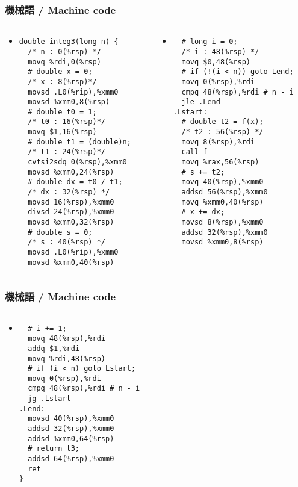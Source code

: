 \documentclass[12pt,dvipdfmx]{beamer}
\begin{document}
\begin{frame}[fragile]
  \frametitle{機械語 / Machine code}
  \begin{columns}
    \begin{column}{0.49\textwidth}
  \begin{itemize}
  \item []
\begin{lstlisting}
double integ3(long n) {
  /* n : 0(%rsp) */
  movq %rdi,0(%rsp)  
  # double x = 0;
  /* x : 8(%rsp)*/
  movsd .L0(%rip),%xmm0
  movsd %xmm0,8(%rsp)
  # double t0 = 1;
  /* t0 : 16(%rsp)*/
  movq $1,16(%rsp)
  # double t1 = (double)n;
  /* t1 : 24(%rsp)*/
  cvtsi2sdq 0(%rsp),%xmm0
  movsd %xmm0,24(%rsp)
  # double dx = t0 / t1;
  /* dx : 32(%rsp) */
  movsd 16(%rsp),%xmm0
  divsd 24(%rsp),%xmm0
  movsd %xmm0,32(%rsp)
  # double s = 0;
  /* s : 40(%rsp) */
  movsd .L0(%rip),%xmm0
  movsd %xmm0,40(%rsp)
\end{lstlisting}%
  \end{itemize}
    \end{column}
    \begin{column}{0.49\textwidth}
  \begin{itemize}
  \item []
\begin{lstlisting}
  # long i = 0;
  /* i : 48(%rsp) */
  movq $0,48(%rsp)
  # if (!(i < n)) goto Lend;
  movq 0(%rsp),%rdi
  cmpq 48(%rsp),%rdi # n - i
  jle .Lend
.Lstart:
  # double t2 = f(x);
  /* t2 : 56(%rsp) */
  movq 8(%rsp),%rdi
  call f
  movq %rax,56(%rsp)
  # s += t2;
  movq 40(%rsp),%xmm0
  addsd 56(%rsp),%xmm0
  movq %xmm0,40(%rsp)
  # x += dx;
  movsd 8(%rsp),%xmm0
  addsd 32(%rsp),%xmm0
  movsd %xmm0,8(%rsp)
\end{lstlisting}%
\end{itemize}
\end{column}
\end{columns}
  
\end{frame}


\begin{frame}[fragile]
  \frametitle{機械語 / Machine code}
  \begin{columns}
    \begin{column}{0.49\textwidth}
  \begin{itemize}
  \item []
\begin{lstlisting}
  # i += 1;
  movq 48(%rsp),%rdi
  addq $1,%rdi
  movq %rdi,48(%rsp)
  # if (i < n) goto Lstart;
  movq 0(%rsp),%rdi
  cmpq 48(%rsp),%rdi # n - i
  jg .Lstart
.Lend:
  movsd 40(%rsp),%xmm0
  addsd 32(%rsp),%xmm0
  addsd %xmm0,64(%rsp)
  # return t3;
  addsd 64(%rsp),%xmm0
  ret
}
\end{lstlisting}%
  \end{itemize}
    \begin{column}{0.49\textwidth}
\phantom{aaa}
\end{column}
    \end{column}
\end{columns}
\end{frame}
\end{document}
